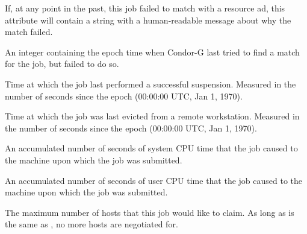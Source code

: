 \begin{description}
\item[\AdAttr{LastRejMatchReason}:]   If, at any point in the past,
this job failed to match with a resource ad,
this attribute will contain a string with a
human-readable message about why the match failed.

\item[\AdAttr{LastRejMatchTime}:]   An integer containing the epoch
time when Condor-G last tried to find a match for the job,
but failed to do so.

\item[\AdAttr{LastSuspensionTime}:]  Time at which the job last performed a
successful suspension.  Measured in the number of seconds since the
epoch (00:00:00 UTC, Jan 1, 1970).

\item[\AdAttr{LastVacateTime}:]  Time at which the job was last
evicted from a remote workstation.  Measured in the number of seconds
since the epoch (00:00:00 UTC, Jan 1, 1970).

\item[\AdAttr{LocalSysCpu}:]  An accumulated number of seconds of 
system CPU time that the job caused to the machine upon which
the job was submitted.

\item[\AdAttr{LocalUserCpu}:]  An accumulated number of seconds of 
user CPU time that the job caused to the machine upon which
the job was submitted.

\item[\AdAttr{MaxHosts}:]  The maximum number of hosts that this job would
like to claim. As long as  is the same as
, no more hosts are negotiated for.


\end{description}
